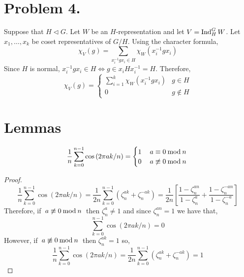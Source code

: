 \documentclass[12pt]{extarticle}
\begin{document}
\section*{Problem 4.}

Suppose that $H \triangleleft G$. Let $W$ be an $H$-representation and let $V = \mathrm{Ind}^{G}_{H} \, W$. Let $x_1, \dots, x_k$ be coset representatives of $G/H$.  Using the character formula,
\[ \chi_V(g) = \sum_{x_i^{-1} g x_i \in H} \chi_W(x_i^{-1} g x_i) \]
Since $H$ is normal, $x_i^{-1} g x_i \in H \iff g \in x_i H x_i^{-1} = H$. Therefore, 
\[ \chi_V(g) =
\begin{cases}
\sum\limits_{i = 1}^k \chi_W(x_i^{-1} g x_i) & g \in H \\
0 & g \notin H
\end{cases}\]

\section*{Lemmas}

\begin{lemma} \label{complimentlem}
\[\frac{1}{n} \sum_{k = 0}^{n - 1} \cos{(2 \pi a k / n)} = \begin{cases}
1 & \mod{a}{0}{n} \\
0 & \nmod{a}{0}{n}
\end{cases} \]
\end{lemma}
\begin{proof}
\[\frac{1}{n} \sum_{k = 0}^{n - 1} \cos{(2 \pi a k / n)} = \frac{1}{2n} \sum_{k = 0}^{n - 1}  ( \zeta^{a k}_n + \zeta^{-a k}_n) = \frac{1}{2n} \left[ \frac{1 - \zeta_n^{a n}}{1 - \zeta_n^{a}} + \frac{1 - \zeta_n^{-a n}}{1 - \zeta_n^{-a}} \right] \]
Therefore, if $\nmod{a}{0}{n}$ then $\zeta_n^a \neq 1$ and since $\zeta_n^{an} = 1$ we have that,
\[ \sum_{k = 0}^{n - 1} \cos{(2 \pi a k / n)} = 0\]
However, if $\nmod{a}{0}{n}$ then $\zeta_n^{ak} = 1$ so,
\[\frac{1}{n} \sum_{k = 0}^{n - 1} \cos{(2 \pi a k / n)} = \frac{1}{2n} \sum_{k = 0}^{n - 1}  ( \zeta^{a k}_n + \zeta^{-a k}_n) = 1 \]
\end{proof}
\end{document}
